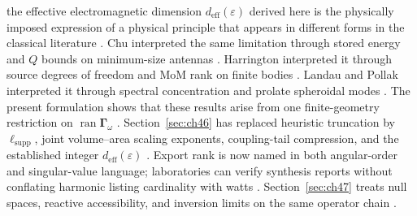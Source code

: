 the effective electromagnetic dimension $d_{\mathrm{eff}}(\varepsilon)$ derived here is the physically imposed
expression of a physical principle that appears in different forms in the classical literature
\cite{harrington2001}.
Chu interpreted the same limitation through stored energy and $Q$ bounds on minimum-size antennas
\cite{chu1948}.
Harrington interpreted it through source degrees of freedom and MoM rank on finite bodies \cite{harrington2001}.
Landau and Pollak interpreted it through spectral concentration and prolate spheroidal modes
\cite{landau1962}.
The present formulation shows that these results arise from one finite-geometry restriction on
$\operatorname{ran}\boldsymbol{\Gamma}_\omega$ \cite{stratton1941}.
Section~\ref{sec:ch46} has replaced heuristic truncation by \(\ell_{\mathrm{supp}}\), joint volume--area scaling exponents, coupling-tail
compression, and the established integer \(d_{\mathrm{eff}}(\varepsilon)\) \cite{stratton1941}. Export
rank is now named in both angular-order and singular-value language; laboratories can verify synthesis reports without conflating harmonic listing cardinality
with watts \cite{hansen1988}. Section~\ref{sec:ch47} treats null spaces, reactive accessibility, and inversion limits on the same operator
chain \cite{stratton1941}.
